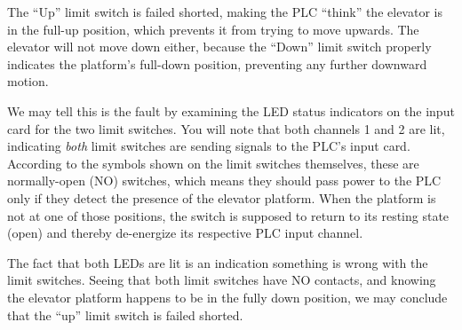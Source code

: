 The ``Up'' limit switch is failed shorted, making the PLC ``think'' the elevator is in the full-up position, which prevents it from trying to move upwards.  The elevator will not move down either, because the ``Down'' limit switch properly indicates the platform's full-down position, preventing any further downward motion.

\vskip 10pt

We may tell this is the fault by examining the LED status indicators on the input card for the two limit switches.  You will note that both channels 1 and 2 are lit, indicating {\it both} limit switches are sending signals to the PLC's input card.  According to the symbols shown on the limit switches themselves, these are normally-open (NO) switches, which means they should pass power to the PLC only if they detect the presence of the elevator platform.  When the platform is not at one of those positions, the switch is supposed to return to its resting state (open) and thereby de-energize its respective PLC input channel.

The fact that both LEDs are lit is an indication something is wrong with the limit switches.  Seeing that both limit switches have NO contacts, and knowing the elevator platform happens to be in the fully down position, we may conclude that the ``up'' limit switch is failed shorted.











